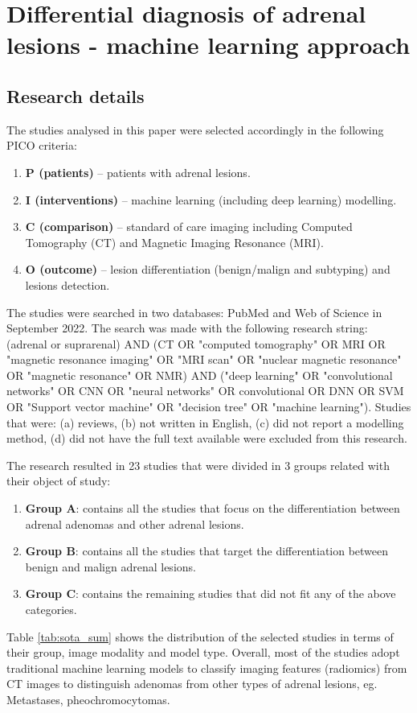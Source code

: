 \documentclass{article}
\begin{document}
\section{Differential diagnosis of adrenal lesions - machine learning approach}

\subsection{Research details}

The studies analysed in this paper were selected accordingly in the following PICO criteria:

\begin{enumerate}
    \item[] \textbf{P (patients) }– patients with adrenal lesions.
    \item[] \textbf{I (interventions) }– machine learning (including deep learning) modelling.
    \item[] \textbf{C (comparison) }– standard of care imaging including Computed Tomography (CT) and Magnetic Imaging Resonance (MRI).
    \item[] \textbf{O (outcome) }– lesion differentiation (benign/malign and subtyping) and lesions detection.
\end{enumerate}

The studies were searched in two databases: PubMed and Web of Science in
September 2022. The search was made with the following research string: (adrenal
or suprarenal) AND (CT OR "computed tomography" OR MRI OR "magnetic resonance
imaging" OR "MRI scan" OR "nuclear magnetic resonance" OR "magnetic resonance"
OR NMR) AND ("deep learning" OR "convolutional networks" OR CNN OR "neural
networks" OR convolutional OR DNN OR SVM OR "Support vector machine" OR
"decision tree" OR "machine learning"). Studies that were: (a) reviews, (b) not
written in English, (c) did not report a modelling method, (d) did not have the
full text available were excluded from this research.

The research resulted in 23 studies that were divided in 3 groups related with
their object of study:
\begin{enumerate}
    \item[] \textbf{Group A}: contains all the studies that focus on the
        differentiation between adrenal adenomas and other adrenal lesions.
    \item[] \textbf{Group B}: contains all the studies that target the
        differentiation between benign and malign adrenal lesions.
    \item[] \textbf{Group C}: contains the remaining studies that did not fit
        any of the above categories.
\end{enumerate}
Table \ref{tab:sota_sum} shows the distribution of the selected studies in terms
of their group, image modality and model type. Overall, most of the studies
adopt traditional machine learning models to classify imaging features
(radiomics) from CT images to distinguish adenomas from other types of adrenal
lesions, eg. Metastases, pheochromocytomas.
\end{document}
